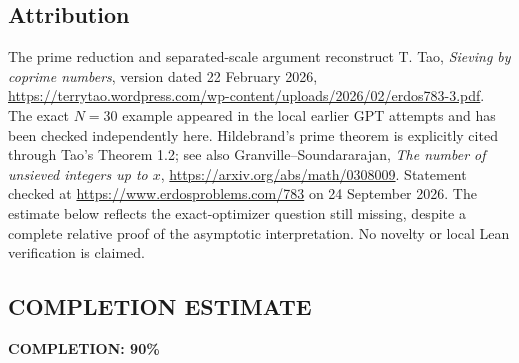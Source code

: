 \subsection*{Attribution}
The prime reduction and separated-scale argument reconstruct T. Tao, \emph{Sieving by coprime numbers}, version dated 22 February 2026, \url{https://terrytao.wordpress.com/wp-content/uploads/2026/02/erdos783-3.pdf}. The exact \(N=30\) example appeared in the local earlier GPT attempts and has been checked independently here. Hildebrand's prime theorem is explicitly cited through Tao's Theorem 1.2; see also Granville--Soundararajan, \emph{The number of unsieved integers up to \(x\)}, \url{https://arxiv.org/abs/math/0308009}. Statement checked at \url{https://www.erdosproblems.com/783} on 24 September 2026. The estimate below reflects the exact-optimizer question still missing, despite a complete relative proof of the asymptotic interpretation. No novelty or local Lean verification is claimed.
\subsection*{COMPLETION ESTIMATE}
\textbf{COMPLETION: 90\%}

